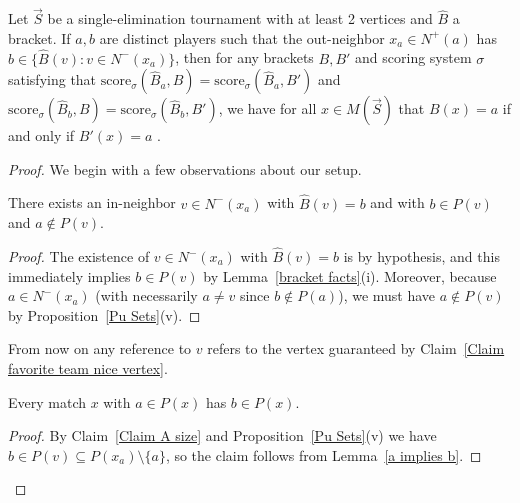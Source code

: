 \documentclass[10pt,a4paper]{amsart}
\newcommand{\score}{\mathrm{score}}
\newcommand{\sig}{\sigma}
\newcommand{\sm}{\setminus}
\newcommand{\sub}{\subseteq}
\newcommand{\tour}{\vec{S}}
\begin{document}
\begin{lem}\label{favorite team}
	Let $\tour$ be a single-elimination tournament with at least 2 vertices and $\widehat{B}$ a bracket.  If $a,b$ are distinct players such that the out-neighbor $x_a\in N^+(a)$ has $b\in \{\widehat{B}(v):v\in N^-(x_a)\}$, then for any brackets $B,B'$ and scoring system $\sig$ satisfying that $\score_\sig(\widehat{B}_a,B)=\score_\sig(\widehat{B}_a,B')$ and $\score_\sig(\widehat{B}_b,B)=\score_\sig(\widehat{B}_b,B')$, we have for all $x\in M(\tour)$ that $B(x)=a$ if and only if $B'(x)=a$ .
\end{lem}

\begin{proof}
	We begin with a few observations about our setup.
	\begin{claim}\label{Claim favorite team nice vertex}
		There exists an in-neighbor $v\in N^-(x_a)$ with $\widehat{B}(v)=b$ and with $b\in P(v)$ and $a\notin P(v)$.
	\end{claim}
	\begin{proof}
		The existence of $v\in N^-(x_a)$ with $\widehat{B}(v)=b$ is by hypothesis, and this immediately implies $b\in P(v)$ by Lemma~\ref{bracket facts}(i).  Moreover, because $a\in N^-(x_a)$ (with necessarily $a\ne v$ since $b\notin P(a)$), we must have $a\notin P(v)$ by Proposition~\ref{Pu Sets}(v).
	\end{proof}
	From now on any reference to $v$ refers to the vertex guaranteed by Claim~\ref{Claim favorite team nice vertex}.
	
	\begin{claim}\label{Claim favorite team a implies b}
		Every match $x$ with $a\in P(x)$ has $b\in P(x)$.
	\end{claim}
	\begin{proof}
		By Claim~\ref{Claim A size} and Proposition~\ref{Pu Sets}(v) we have $b\in P(v)\sub P(x_a)\sm \{a\}$, so the claim follows from Lemma~\ref{a implies b}.
		
		
	\end{proof}
	

\end{proof}
\end{document}
